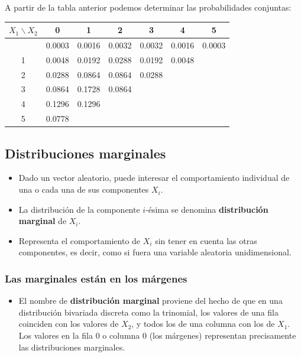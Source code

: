 \documentclass[
]{article}
\providecommand{\tightlist}{%
  \setlength{\itemsep}{0pt}\setlength{\parskip}{0pt}}
\begin{document}
A partir de la tabla anterior podemos determinar las probabilidades conjuntas:

\begin{longtable}[]{@{}ccccccc@{}}
\toprule\noalign{}
\(X_{1} \backslash X_{2}\) & 0 & 1 & 2 & 3 & 4 & 5 \\
\midrule\noalign{}
\endhead
\bottomrule\noalign{}
\endlastfoot
0 & 0.0003 & 0.0016 & 0.0032 & 0.0032 & 0.0016 & 0.0003 \\
1 & 0.0048 & 0.0192 & 0.0288 & 0.0192 & 0.0048 & \\
2 & 0.0288 & 0.0864 & 0.0864 & 0.0288 & & \\
3 & 0.0864 & 0.1728 & 0.0864 & & & \\
4 & 0.1296 & 0.1296 & & & & \\
5 & 0.0778 & & & & & \\
\end{longtable}

\subsection{Distribuciones marginales}\label{distribuciones-marginales}

\begin{itemize}
\item
  Dado un vector aleatorio, puede interesar el comportamiento individual de una o cada una de sus componentes \(X_i\).
\item
  La distribución de la componente \(i\)-ésima se denomina \textbf{distribución marginal} de \(X_i\).
\item
  Representa el comportamiento de \(X_i\) sin tener en cuenta las otras componentes, es decir, como si fuera una variable aleatoria unidimensional.
\end{itemize}

\subsubsection{Las marginales están en los márgenes}\label{las-marginales-estuxe1n-en-los-muxe1rgenes}

\begin{itemize}
\tightlist
\item
  El nombre de \textbf{distribución marginal} proviene del hecho de que en una distribución bivariada discreta como la trinomial, los valores de una fila coinciden con los valores de \(X_2\), y todos los de una columna con los de \(X_1\). Los valores en la fila 0 o columna 0 (los márgenes) representan precisamente las distribuciones marginales.
\end{itemize}
\end{document}
